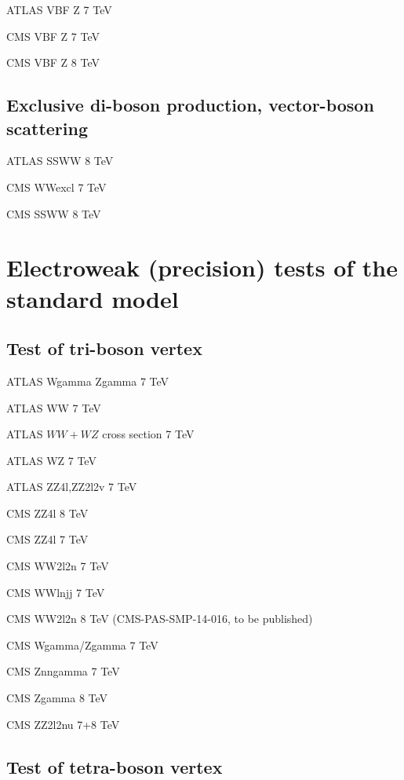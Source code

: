 \documentclass[12pt]{iopart}
\begin{document}
ATLAS VBF Z 7 TeV~\cite{Aad:2014dta}

CMS VBF Z 7 TeV~\cite{Chatrchyan:2013jya}

CMS VBF Z 8 TeV~\cite{Khachatryan:2014dea}

\subsection{Exclusive di-boson production, vector-boson scattering}

ATLAS SSWW 8 TeV~\cite{Aad:2014zda}

CMS WWexcl 7 TeV~\cite{Chatrchyan:2013foa}

CMS SSWW 8 TeV~\cite{Khachatryan:2014sta}

\section{Electroweak (precision) tests of the standard model}
\subsection{Test of tri-boson vertex}

ATLAS Wgamma Zgamma 7 TeV~\cite{Aad:2013izg}

ATLAS WW 7 TeV~\cite{ATLAS:2012mec}

ATLAS $WW+WZ$ cross section 7 TeV~\cite{Aad:2014mda}

ATLAS WZ 7 TeV~\cite{Aad:2012twa}

ATLAS ZZ4l,ZZ2l2v 7 TeV~\cite{Aad:2012awa}

CMS ZZ4l 8 TeV~\cite{Khachatryan:2014dia}

CMS ZZ4l 7 TeV~\cite{Chatrchyan:2012sga}

CMS WW2l2n 7 TeV~\cite{Chatrchyan:2013yaa}

CMS WWlnjj 7 TeV~\cite{Chatrchyan:2012bd}

CMS WW2l2n 8 TeV (CMS-PAS-SMP-14-016, to be published)

CMS Wgamma/Zgamma 7 TeV~\cite{Chatrchyan:2013fya}

CMS Znngamma 7 TeV~\cite{Chatrchyan:2013nda}

CMS Zgamma 8 TeV~\cite{Khachatryan:2015kea}

CMS ZZ2l2nu 7+8 TeV~\cite{Khachatryan:2015pba}

\subsection{Test of tetra-boson vertex}
\end{document}
